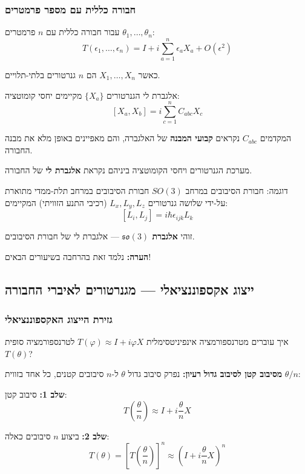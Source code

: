 \subsubsection{חבורה כללית עם מספר פרמטרים}

עבור חבורה כללית עם $n$ פרמטרים $\theta_1, \ldots, \theta_n$:
\[
\boxed{T(\epsilon_1, \ldots, \epsilon_n) = I + i\sum_{a=1}^{n} \epsilon_a X_a + O(\epsilon^2)}
\]

כאשר $X_1, \ldots, X_n$ הם $n$ גנרטורים בלתי-תלויים.

\begin{definitionbox}{אלגברת לי}
הגנרטורים $\{X_a\}$ מקיימים יחסי קומוטציה:
\[
\boxed{[X_a, X_b] = i\sum_{c=1}^{n} C_{abc} X_c}
\]

המקדמים $C_{abc}$ נקראים \textbf{קבועי המבנה}  של האלגברה, והם מאפיינים באופן מלא את מבנה החבורה.

מערכת הגנרטורים ויחסי הקומוטציה ביניהם נקראת \textbf{אלגברת לי} של החבורה.
\end{definitionbox}

\begin{examplebox}{דוגמה: חבורת הסיבובים במרחב $SO(3)$}
חבורת הסיבובים במרחב תלת-ממדי מתוארת על-ידי שלושה גנרטורים $L_x, L_y, L_z$ (רכיבי התנע הזוויתי) המקיימים:
\[
[L_i, L_j] = i\hbar \epsilon_{ijk} L_k
\]

זוהי \textbf{אלגברת $\mathfrak{so}(3)$} — אלגברת לי של חבורת הסיבובים.

\textbf{הערה:} נלמד זאת בהרחבה בשיעורים הבאים!
\end{examplebox}

\subsection{ייצוג אקספוננציאלי — מגנרטורים לאיברי החבורה}

\subsubsection{גזירת הייצוג האקספוננציאלי}

איך עוברים מטרנספורמציה אינפיניטסימלית $T(\varphi) \approx I + i\varphi X$ לטרנספורמציה סופית $T(\theta)$?

\textbf{מסיבוב קטן לסיבוב גדול}
\textbf{רעיון:} נפרק סיבוב גדול $\theta$ ל-$n$ סיבובים קטנים, כל אחד בזווית $\theta/n$:

\textbf{שלב 1:} סיבוב קטן:
\[
T\left(\frac{\theta}{n}\right) \approx I + i\frac{\theta}{n} X
\]

\textbf{שלב 2:} ביצוע $n$ סיבובים כאלה:
\[
T(\theta) = \left[T\left(\frac{\theta}{n}\right)\right]^n \approx \left(I + i\frac{\theta}{n} X\right)^n
\]

